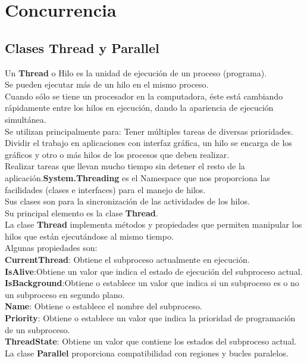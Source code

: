 \documentclass[12pt,a4paper]{report}
\begin{document}
\chapter{Concurrencia}
\section{Clases Thread y Parallel}
Un \textbf{Thread} o Hilo es la unidad de ejecución de un proceso (programa).\\Se pueden ejecutar más de un hilo en el mismo proceso.\\Cuando sólo se tiene un procesador en la computadora, éste está cambiando rápidamente entre los hilos en ejecución, dando la apariencia de ejecución simultánea.\\Se utilizan principalmente para: Tener múltiples tareas de diversas prioridades.\\Dividir el trabajo en aplicaciones con interfaz gráfica, un hilo se encarga de los gráficos y otro o más hilos de los procesos que deben realizar.\\Realizar tareas que llevan mucho tiempo sin detener el resto de la aplicación.\textbf{System.Threading} es el Namespace que nos proporciona las facilidades (clases e interfaces) para el manejo de hilos.\\Sus clases son para la sincronización de las actividades de los hilos.\\Su principal elemento es la clase\textbf{ Thread}.\\La clase \textbf{Thread} implementa métodos y propiedades que permiten manipular los hilos que están ejecutándose al mismo tiempo.\\Algunas propiedades son:\\\textbf{CurrentThread}: Obtiene el subproceso actualmente en ejecución.\\\textbf{IsAlive}:Obtiene un valor que indica el estado de ejecución del subproceso actual.\\\textbf{IsBackground}:Obtiene o establece un valor que indica si un subproceso es o no un subproceso en segundo plano.\\\textbf{Name}: Obtiene o establece el nombre del subproceso.\\\textbf{Priority}: Obtiene o establece un valor que indica la prioridad de programación de un subproceso.\\\textbf{ThreadState}: Obtiene un valor que contiene los estados del subproceso actual.\\La clase\textbf{ Parallel} proporciona compatibilidad con regiones y bucles paralelos.
\end{document}
